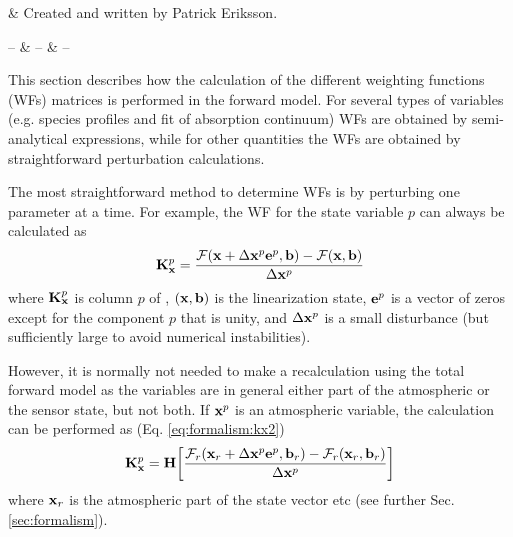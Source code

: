 %
%
 \label{sec:wfuns}


%
%
 & Created and written by Patrick Eriksson.\\
\stophistory


%
%
%
\startsymbols
  -- & -- & -- \\
 \label{symtable:wfuns}     
\stopsymbols



%
%
This section describes how the calculation of the different weighting
functions (WFs) matrices is performed in the forward model. For
several types of variables (e.g. species profiles and fit of
absorption continuum) WFs are obtained by semi-analytical expressions,
while for other quantities the WFs are obtained by straightforward
perturbation calculations.



 \label{sec:wfuns:approaches}

  The most straightforward method to determine WFs is by perturbing
  one parameter at a time. For example, the WF for the state variable
  $p$ can always be calculated as
  \begin{equation}
    \mathbf{K}_{\mathbf{x}}^p = \frac{\mathcal{F}(\mathbf{x}+\Delta\mathbf{x}^p\mathbf{e}^p,\mathbf{b})-\mathcal{F}(\mathbf{x},\mathbf{b})}
                                     {\Delta\mathbf{x}^p}
   \label{eq:wfuns:perturb}
  \end{equation}
  where $\mathbf{K}_{\mathbf{x}}^p$ is column $p$ of \Kx, $(\mathbf{x},\mathbf{b})$ is the
  linearization state, $\mathbf{e}^p$ is a vector of zeros except for the
  component $p$ that is unity, and $\Delta\mathbf{x}^p$ is a small disturbance
  (but sufficiently large to avoid numerical instabilities).
  
  However, it is normally not needed to make a recalculation using the
  total forward model as the variables are in general either part of the
  atmospheric or the sensor state, but not both. If $\mathbf{x}^p$ is an atmospheric
  variable, the calculation can be performed as (Eq. \ref{eq:formalism:kx2})
  \begin{equation}
    \mathbf{K}_{\mathbf{x}}^p = \mathbf{H} \bigg[
    \frac{\mathcal{F}_r(\mathbf{x}_r+\Delta\mathbf{x}^p\mathbf{e}^p,\mathbf{b}_r)-
           \mathcal{F}_r(\mathbf{x}_r,\mathbf{b}_r)}  {\Delta\mathbf{x}^p} \bigg]
   \label{eq:wfuns:Hpert}
  \end{equation}
  where $\mathbf{x}_r$ is the atmospheric part of the state vector etc (see
  further Sec.  \ref{sec:formalism}).
 

